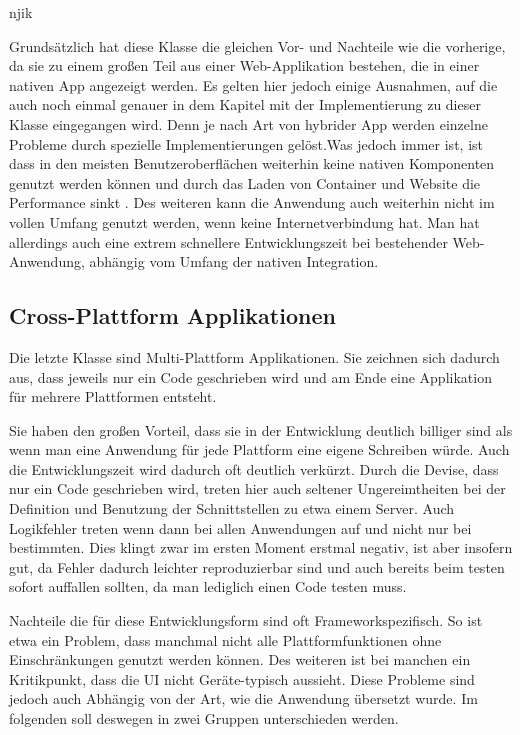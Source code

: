 njik

Grundsätzlich hat diese Klasse die gleichen Vor- und Nachteile wie die vorherige, da sie zu einem großen Teil aus einer Web-Applikation bestehen, die in einer nativen App angezeigt werden. Es gelten hier jedoch einige Ausnahmen, auf die auch noch einmal genauer in dem Kapitel mit der Implementierung zu dieser Klasse eingegangen wird. Denn je nach Art von hybrider App werden einzelne Probleme durch spezielle Implementierungen gelöst.Was jedoch immer ist, ist dass in den meisten Benutzeroberflächen weiterhin keine nativen Komponenten genutzt werden können und durch das Laden von Container und Website die Performance sinkt \cite{IEEE_development_classes}. Des weiteren kann die Anwendung auch weiterhin nicht im vollen Umfang genutzt werden, wenn keine Internetverbindung hat. Man hat allerdings auch eine extrem schnellere Entwicklungszeit bei bestehender Web-Anwendung, abhängig vom Umfang der nativen Integration.

\subsection{Cross-Plattform Applikationen}
Die letzte Klasse sind Multi-Plattform Applikationen. Sie zeichnen sich dadurch aus, dass jeweils nur ein Code geschrieben wird und am Ende eine Applikation für mehrere Plattformen entsteht. 

Sie haben den großen Vorteil, dass sie in der Entwicklung deutlich billiger sind als wenn man eine Anwendung für jede Plattform eine eigene Schreiben würde. Auch die Entwicklungszeit wird dadurch oft deutlich verkürzt. Durch die Devise, dass nur ein Code geschrieben wird, treten hier auch seltener Ungereimtheiten bei der Definition und Benutzung der Schnittstellen zu etwa einem Server. Auch Logikfehler treten wenn dann bei allen Anwendungen auf und nicht nur bei bestimmten. Dies klingt zwar im ersten Moment erstmal negativ, ist aber insofern gut, da Fehler dadurch leichter reproduzierbar sind und auch bereits beim testen sofort auffallen sollten, da man lediglich einen Code testen muss.

Nachteile die für diese Entwicklungsform sind oft Frameworkspezifisch. So ist etwa ein Problem, dass manchmal nicht alle Plattformfunktionen ohne Einschränkungen genutzt werden können. Des weiteren ist bei manchen ein Kritikpunkt, dass die UI nicht Geräte-typisch aussieht. Diese Probleme sind jedoch auch Abhängig von der Art, wie die Anwendung übersetzt wurde. Im folgenden soll deswegen in zwei Gruppen unterschieden werden.

